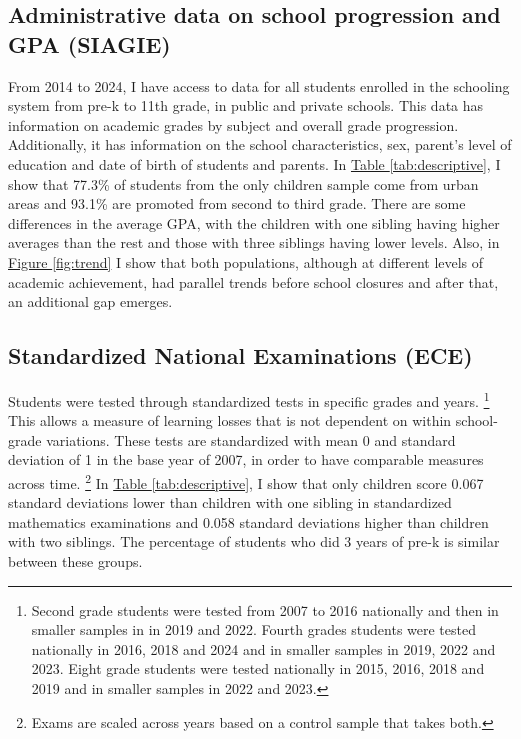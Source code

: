 \subsection{Administrative data on school progression and GPA (SIAGIE)}

From 2014 to 2024, I have access to data for all students enrolled in the schooling system from pre-k to 11th grade, in public and private schools. This data has information on academic grades by subject and overall grade progression. Additionally, it has information on the school characteristics, sex, parent's level of education and date of birth of students and parents. In \hyperref[tab:descriptive]{Table \ref{tab:descriptive}}, I show that 77.3\% of students from the only children sample come from urban areas and 93.1\% are promoted from second to third grade. There are some differences in the average GPA, with the children with one sibling having higher averages than the rest and those with three siblings having lower levels. Also, in \hyperref[fig:trend]{Figure \ref{fig:trend}} I show that both populations, although at different levels of academic achievement, had parallel trends before school closures and after that, an additional gap emerges.

\subsection{Standardized National Examinations (ECE)}

Students were tested through standardized tests in specific grades and years. \footnote{Second grade students were tested from 2007 to 2016 nationally and then in smaller samples in in 2019 and 2022. Fourth grades students were tested nationally in 2016, 2018 and 2024 and in smaller samples in 2019, 2022 and 2023. Eight grade students were tested nationally in 2015, 2016, 2018 and 2019 and in smaller samples in 2022 and 2023.} This allows a measure of learning losses that is not dependent on within school-grade variations. These tests are standardized with mean 0 and standard deviation of 1 in the base year of 2007, in order to have comparable measures across time. \footnote{Exams are scaled across years based on a control sample that takes both.} In \hyperref[tab:descriptive]{Table \ref{tab:descriptive}}, I show that only children score 0.067 standard deviations lower than children with one sibling in standardized mathematics examinations and 0.058 standard deviations higher than children with two siblings. The percentage of students who did 3 years of pre-k is similar between these groups.  

